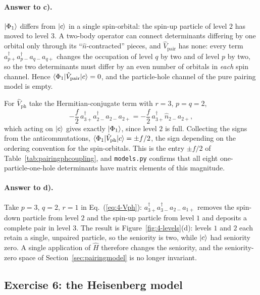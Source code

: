 \paragraph{Answer to c).}
$\vert \Phi_1 \rangle$ differs from $\vert c \rangle$ in a single spin-orbital: the
spin-up particle of level $2$ has moved to level $3$.  A two-body operator can
connect determinants differing by one orbital only through its
``$\hat{n}$-contracted'' pieces, and $\hat{V}_{\mathrm{pair}}$ has none: every
term $a^{\dagger}_{p+}a^{\dagger}_{p-}a_{q-}a_{q+}$ changes the occupation of
level $q$ by two and of level $p$ by two, so the two determinants must differ
by an even number of orbitals in \emph{each} spin channel.  Hence
$\langle \Phi_1 | \hat{V}_{\mathrm{pair}} | c \rangle=0$, and the particle-hole
channel of the pure pairing model is empty.

For $\hat{V}_{\mathrm{ph}}$ take the Hermitian-conjugate term with
$r=3$, $p=q=2$,
\[
  -\frac{f}{2}\,a^{\dagger}_{3+}a^{\dagger}_{2-}a_{2-}a_{2+}
   = -\frac{f}{2}\,a^{\dagger}_{3+}\hat{n}_{2-}a_{2+},
\]
which acting on $\vert c \rangle$ gives exactly $\vert \Phi_1 \rangle$, since level $2$ is
full.  Collecting the signs from the anticommutations,
$\langle \Phi_1 | \hat{V}_{\mathrm{ph}} | c \rangle=\pm f/2$, the sign depending on
the ordering convention for the spin-orbitals.  This is the entry $\pm f/2$ of
Table~\ref{tab:pairingphcoupling}, and \texttt{models.py} confirms that all
eight one-particle-one-hole determinants have matrix elements of this
magnitude.

\paragraph{Answer to d).}
Take $p=3$, $q=2$, $r=1$ in Eq.~(\ref{eq:4-Vph}):
$a^{\dagger}_{3+}a^{\dagger}_{3-}a_{2-}a_{1+}$ removes the spin-down particle
from level $2$ and the spin-up particle from level $1$ and deposits a complete
pair in level $3$.  The result is Figure~\ref{fig:4-levels}(d): levels $1$ and
$2$ each retain a single, unpaired particle, so the seniority is two, while
$\vert c \rangle$ had seniority zero.  A single application of $\hat{H}$ therefore
changes the seniority, and the seniority-zero space of
Section~\ref{sec:pairingmodel} is no longer invariant.

\subsection*{Exercise 6: the Heisenberg model}
\label{ex:4-heisenberg}

